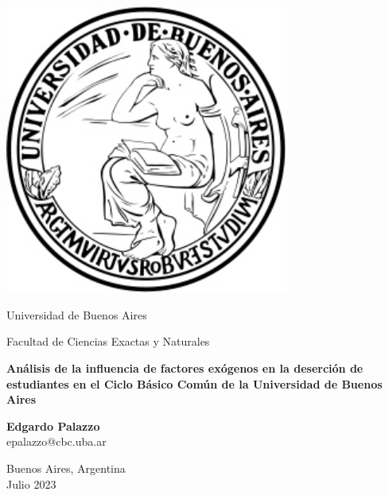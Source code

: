 \documentclass[a4paper,11pt,dvipsnames]{article}
\begin{document}
\begin{titlepage}
    \begin{center}

        \begin{minipage}{0.3\textwidth}
            \begin{flushright}
            \includegraphics[width=0.7\textwidth]{Logo-UBA}
            \end{flushright}
        \end{minipage}
        \begin{minipage}{0.6\textwidth}
            {\Large
            Universidad de Buenos Aires\par\medskip
            Facultad de Ciencias Exactas y Naturales
            }
        \end{minipage}

        \vspace*{3cm}

        \Huge
        \textbf{Análisis de la influencia de factores exógenos en la deserción de estudiantes en el Ciclo Básico Común de la Universidad de Buenos Aires}

        \vspace{0.5cm}
        \LARGE

        \vspace{1.5cm}

        \textbf{Edgardo Palazzo} \\ \normalsize epalazzo@cbc.uba.ar

        \vfill

        \Large
        Buenos Aires, Argentina\\
        Julio 2023

    \end{center}
\end{titlepage}
\end{document}
